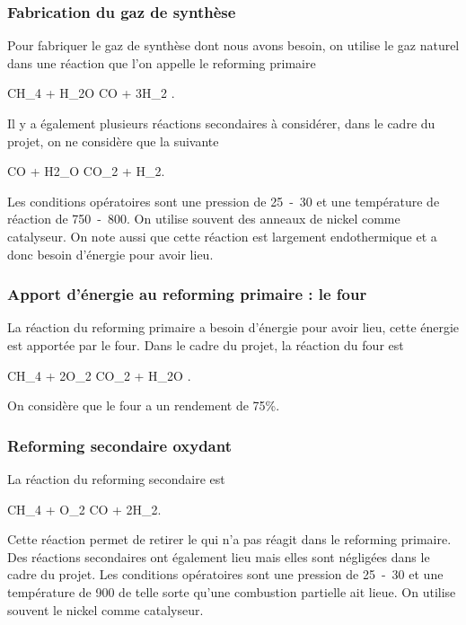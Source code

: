 \subsubsection{Fabrication du gaz de synthèse}
Pour fabriquer le gaz de synthèse 
dont nous avons besoin, on utilise le gaz naturel
 dans une réaction que l'on appelle
le reforming primaire 
\begin{chemmath}
	CH_4 + H_2O \Leftrightarrow CO + 3H_2 .
\end{chemmath}
Il y a également plusieurs réactions secondaires à
considérer, dans le cadre du projet, on ne considère
que la suivante
\begin{chemmath}
	CO + H2_O \Leftrightarrow CO_2 + H_2.
\end{chemmath}
Les conditions opératoires sont une pression
de \unit{25-30}{\bbar} et une température
de réaction de \unit{750-800}{\degreecelsius}.
On utilise souvent des anneaux de nickel comme
catalyseur.
On note aussi que cette réaction est largement
endothermique et a donc besoin d'énergie pour avoir
lieu.

\subsubsection{Apport d'énergie au reforming primaire : le four}
La réaction du reforming primaire a besoin
d'énergie pour avoir lieu, cette énergie est apportée
par le four. Dans le cadre du projet, la réaction
du four est
\begin{chemmath}
	CH_4 + 2O_2 \rightarrow CO_2 + H_2O .
\end{chemmath}
On considère que le four a un rendement de 75\%.

\subsubsection{Reforming secondaire oxydant}
La réaction du reforming secondaire est
\begin{chemmath}
	CH_4 + O_2 \rightarrow CO + 2H_2.
\end{chemmath}
Cette réaction permet de retirer le  qui n'a
pas réagit dans le reforming primaire. %
Des réactions secondaires ont également lieu mais elles
sont négligées dans le cadre du projet.
Les conditions opératoires sont une pression
de \unit{25-30}{\bbar} et une température
de \unit{900}{\degreecelsius} de telle sorte
qu'une combustion partielle ait lieue.
On utilise souvent le nickel comme catalyseur.

